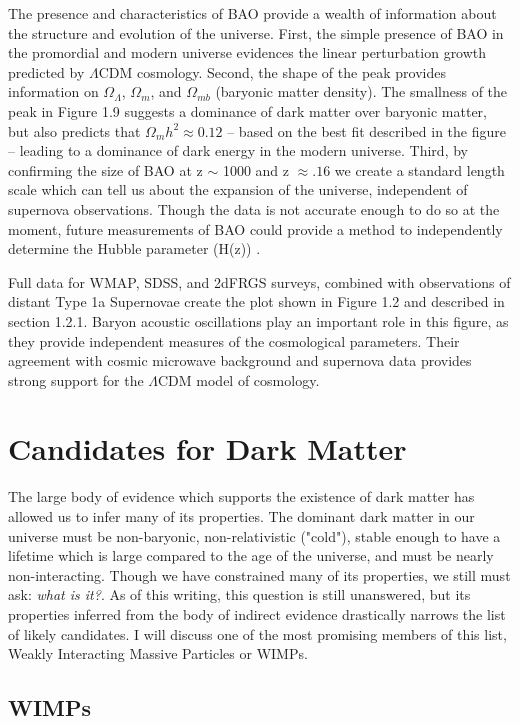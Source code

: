 \documentclass{report}
\begin{document}
The presence and characteristics of BAO provide a wealth of information about the structure and evolution of the universe. First, the simple presence of BAO in the promordial and modern universe evidences the linear perturbation growth predicted by $\Lambda$CDM cosmology. Second, the shape of the peak provides information on $\Omega_{\Lambda}$, $\Omega_{m}$, and $\Omega_{mb}$ (baryonic matter density). The smallness of the peak in Figure 1.9 suggests a dominance of dark matter over baryonic matter, but also predicts that $\Omega_{m}h^2 \approx 0.12$ -- based on the best fit described in the figure -- leading to a dominance of dark energy in the modern universe. Third, by confirming the size of BAO at z $\sim$ 1000 and z $\approx .16$ we create a standard length scale which can tell us about the expansion of the universe, independent of supernova observations. Though the data is not accurate enough to do so at the moment, future measurements of BAO could provide a method to independently determine the Hubble parameter (H(z)) \cite{Eisenstein2005}.

Full data for WMAP, SDSS, and 2dFRGS surveys, combined with observations of distant Type 1a Supernovae create the plot shown in Figure 1.2 and described in section 1.2.1. Baryon acoustic oscillations play an important role in this figure, as they provide independent measures of the cosmological parameters. Their agreement with cosmic microwave background and supernova data provides strong support for the $\Lambda$CDM model of cosmology.

\section{Candidates for Dark Matter}

The large body of evidence which supports the existence of dark matter has allowed us to infer many of its properties. The dominant dark matter in our universe must be non-baryonic, non-relativistic ("cold"), stable enough to have a lifetime which is large compared to the age of the universe, and must be nearly non-interacting. Though we have constrained many of its properties, we still must ask: \emph{what is it?}. As of this writing, this question is still unanswered, but its properties inferred from the body of indirect evidence drastically narrows the list of likely candidates. I will discuss one of the most promising members of this list, Weakly Interacting Massive Particles or WIMPs.

\subsection{WIMPs}
\end{document}
